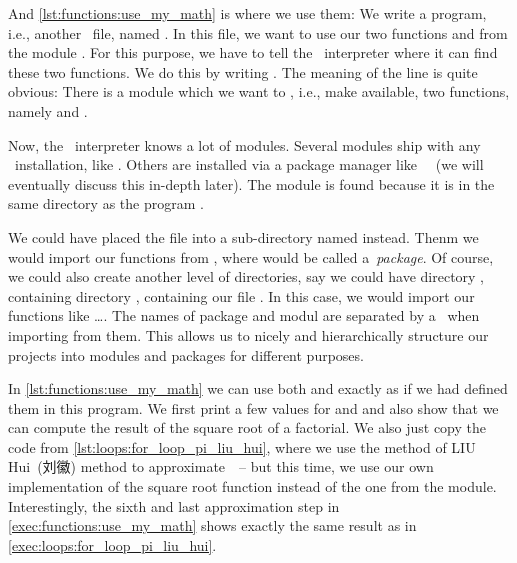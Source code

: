 %
%
%
\begin{sloppypar}%
And \cref{lst:functions:use_my_math} is where we use them:
We write a program, i.e., another \python\ file, named .
In this file, we want to use our two functions  and  from the module .
For this purpose, we have to tell the \python\ interpreter where it can find these two functions.
We do this by writing .
The meaning of the line is quite obvious:
There is a module   which we want to , i.e., make available, two functions, namely  and .%
\end{sloppypar}%
%
Now, the \python\ interpreter knows a lot of modules.
Several modules ship with any \python\ installation, like .
Others are installed via a package manager like ~\cite{PSF:P3D:IPM}~(we will eventually discuss this in-depth later).
The  module is found because it is in the same directory as the program .

We could have placed the  file into a sub-directory named  instead.
Thenm we would import our functions from , where  would be called a~\emph{package}.
Of course, we could also create another level of directories, say we could have directory , containing directory , containing our file .
In this case, we would import our functions like \dots.
The names of package and modul are separated by a~ when importing from them.
This allows us to nicely and hierarchically structure our projects into modules and packages for different purposes.

In \cref{lst:functions:use_my_math} we can use both  and  exactly as if we had defined them in this program.
We first print a few values for  and  and also show that we can compute the result of the square root of a factorial.
We also just copy the code from \cref{lst:loops:for_loop_pi_liu_hui}, where we use the method of LIU Hui~(刘徽) method to approximate~\numberPi\ -- but this time, we use our own implementation of the square root function instead of the one from the  module.
Interestingly, the sixth and last approximation step in \cref{exec:functions:use_my_math} shows exactly the same result as in \cref{exec:loops:for_loop_pi_liu_hui}.

